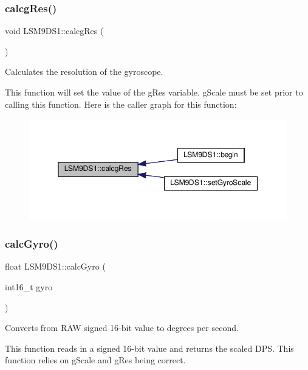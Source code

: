 \subsubsection{\texorpdfstring{calcg\+Res()}{calcgRes()}}
{\footnotesize\ttfamily void L\+S\+M9\+D\+S1\+::calcg\+Res (\begin{DoxyParamCaption}{ }\end{DoxyParamCaption})\hspace{0.3cm}{\ttfamily [protected]}}



Calculates the resolution of the gyroscope. 

This function will set the value of the g\+Res variable. g\+Scale must be set prior to calling this function. Here is the caller graph for this function\+:\nopagebreak
\begin{figure}[H]
\begin{center}
\leavevmode
\includegraphics[width=350pt]{classLSM9DS1_a303e0dd33e000579dc3917aecedb6e63_icgraph}
\end{center}
\end{figure}
\mbox{\label{classLSM9DS1_a76707323565bc4170ea8e27a932c95e4}} 
\subsubsection{\texorpdfstring{calc\+Gyro()}{calcGyro()}}
{\footnotesize\ttfamily float L\+S\+M9\+D\+S1\+::calc\+Gyro (\begin{DoxyParamCaption}\item[{int16\+\_\+t}]{gyro }\end{DoxyParamCaption})}



Converts from R\+AW signed 16-\/bit value to degrees per second. 

This function reads in a signed 16-\/bit value and returns the scaled D\+PS. This function relies on g\+Scale and g\+Res being correct.


